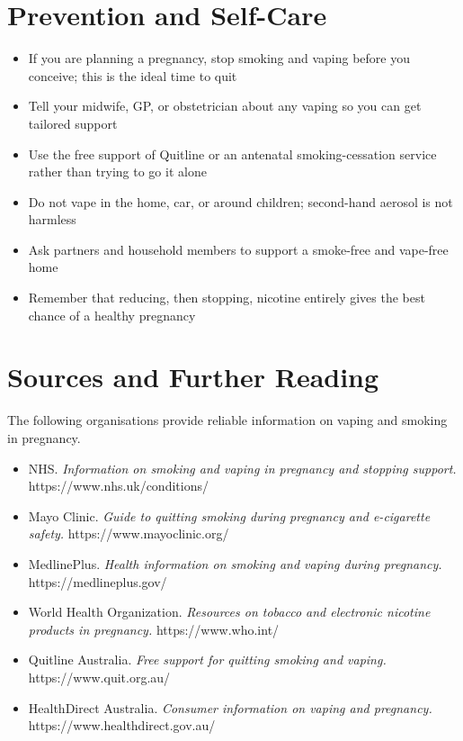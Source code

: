 \section*{Prevention and Self-Care}
\begin{itemize}
    \item If you are planning a pregnancy, stop smoking and vaping before you conceive; this is the ideal time to quit
    \item Tell your midwife, GP, or obstetrician about any vaping so you can get tailored support
    \item Use the free support of Quitline or an antenatal smoking-cessation service rather than trying to go it alone
    \item Do not vape in the home, car, or around children; second-hand aerosol is not harmless
    \item Ask partners and household members to support a smoke-free and vape-free home
    \item Remember that reducing, then stopping, nicotine entirely gives the best chance of a healthy pregnancy
\end{itemize}

\section*{Sources and Further Reading}
The following organisations provide reliable information on vaping and smoking in pregnancy.

\begin{itemize}
    \item NHS. \textit{Information on smoking and vaping in pregnancy and stopping support.} https://www.nhs.uk/conditions/
    \item Mayo Clinic. \textit{Guide to quitting smoking during pregnancy and e-cigarette safety.} https://www.mayoclinic.org/
    \item MedlinePlus. \textit{Health information on smoking and vaping during pregnancy.} https://medlineplus.gov/
    \item World Health Organization. \textit{Resources on tobacco and electronic nicotine products in pregnancy.} https://www.who.int/
    \item Quitline Australia. \textit{Free support for quitting smoking and vaping.} https://www.quit.org.au/
    \item HealthDirect Australia. \textit{Consumer information on vaping and pregnancy.} https://www.healthdirect.gov.au/
\end{itemize}
